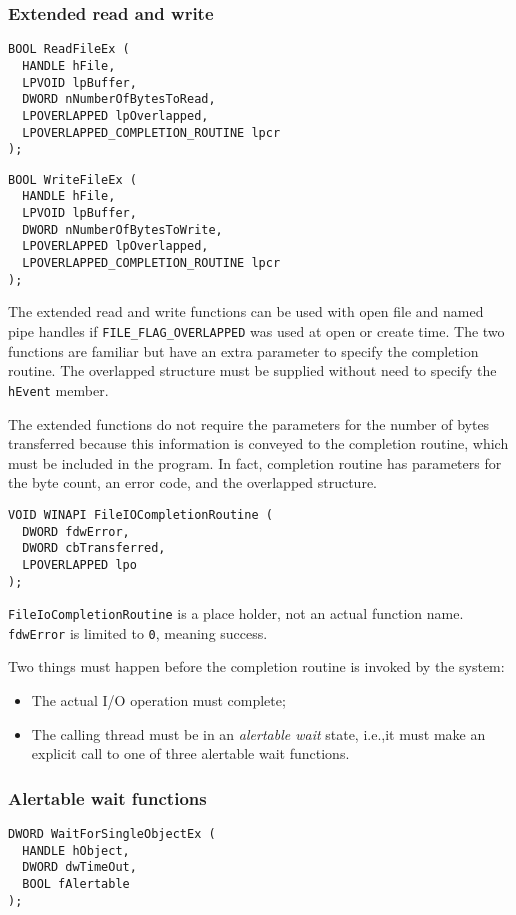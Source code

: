 \subsubsection{Extended read and write}
\begin{verbatim}
BOOL ReadFileEx (
  HANDLE hFile,
  LPVOID lpBuffer,
  DWORD nNumberOfBytesToRead,
  LPOVERLAPPED lpOverlapped,
  LPOVERLAPPED_COMPLETION_ROUTINE lpcr
);
\end{verbatim}

\begin{verbatim}
BOOL WriteFileEx (
  HANDLE hFile,
  LPVOID lpBuffer,
  DWORD nNumberOfBytesToWrite,
  LPOVERLAPPED lpOverlapped,
  LPOVERLAPPED_COMPLETION_ROUTINE lpcr
);
\end{verbatim}

The extended read and write functions can be used with open file and named pipe handles if \texttt{FILE\_FLAG\_OVERLAPPED} was used at open or create time. The two functions are familiar but have an extra parameter to specify the completion routine. The overlapped structure must be supplied without need to specify the \texttt{hEvent} member.

The extended functions do not require the parameters for the number of bytes transferred because this information is conveyed to the completion routine, which must be included in the program. In fact, completion routine has parameters for the byte count, an error code, and the overlapped structure.

\begin{verbatim}
VOID WINAPI FileIOCompletionRoutine (
  DWORD fdwError,
  DWORD cbTransferred,
  LPOVERLAPPED lpo
);
\end{verbatim}
\texttt{FileIoCompletionRoutine} is a place holder, not an actual function name. \texttt{fdwError} is limited to \texttt{0}, meaning success.

Two things must happen before the completion routine is invoked by the system:
\begin{itemize}
\item The actual I/O operation must complete;
\item The calling thread must be in an \emph{alertable wait} state, i.e.,\@ it must make an explicit call to one of three alertable wait functions.
\end{itemize}

\subsubsection{Alertable wait functions}
\begin{verbatim}
DWORD WaitForSingleObjectEx (
  HANDLE hObject,
  DWORD dwTimeOut,
  BOOL fAlertable
);
\end{verbatim}

